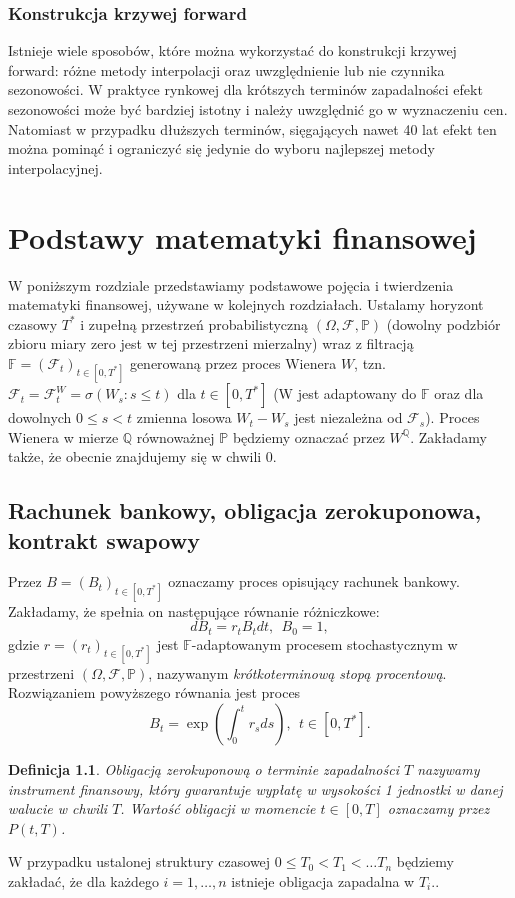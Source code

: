 \documentclass{mini}
\theoremstyle{mythstyle}
\newtheorem{Definicja}{Definicja}[chapter]
\begin{document}
	\subsection{Konstrukcja krzywej forward}
	
	Istnieje wiele sposobów, które można wykorzystać do konstrukcji krzywej forward: różne metody interpolacji oraz uwzględnienie lub nie czynnika sezonowości. W praktyce rynkowej dla krótszych terminów zapadalności efekt sezonowości może być bardziej istotny i należy uwzględnić go w wyznaczeniu cen. Natomiast w przypadku dłuższych terminów, sięgających nawet 40 lat efekt ten można pominąć i ograniczyć się jedynie do wyboru najlepszej metody interpolacyjnej.

\chapter{Podstawy matematyki finansowej}

	W poniższym rozdziale przedstawiamy podstawowe pojęcia i twierdzenia matematyki finansowej, używane w kolejnych rozdziałach. Ustalamy horyzont czasowy $T^*$ i zupełną przestrzeń probabilistyczną $(\Omega, \mathcal{F}, \mathbb{P})$ (dowolny podzbiór zbioru miary zero jest w tej przestrzeni mierzalny) wraz z filtracją $\mathbb{F} = (\mathcal{F}_t)_{t\in [0,T^*]}$ generowaną przez proces Wienera $W$, tzn. $\mathcal{F}_t=\mathcal{F}_t^W=\sigma(W_s:s\leq t)$ dla $t \in [0,T^*]$ (W jest adaptowany do $\mathbb{F}$ oraz dla dowolnych $0 \leq s < t $ zmienna losowa $W_t-W_s$ jest niezależna od $\mathcal{F}_s$). Proces Wienera w mierze $\mathbb{Q}$ równoważnej $\mathbb{P}$ będziemy oznaczać przez $W^\mathbb{Q}$. Zakładamy także, że obecnie znajdujemy się w chwili 0.

\section{Rachunek bankowy, obligacja zerokuponowa, kontrakt swapowy}
	Przez $B=(B_t)_{t\in [0,T^*]}$ oznaczamy proces opisujący rachunek bankowy. Zakładamy, że spełnia on następujące równanie różniczkowe:
	\[ dB_t = r_t B_t dt, \ \ B_0=1, \]
	gdzie $r=(r_t)_{t\in [0,T^*]}$ jest $\mathbb{F}$-adaptowanym procesem stochastycznym w przestrzeni $(\Omega, \mathcal{F},\mathbb{P})$, nazywanym \textit{krótkoterminową stopą procentową}.
	Rozwiązaniem powyższego równania jest proces
	\[ B_t = \exp\left(\int_0^t r_s ds\right), \ \ t\in [0,T^*]. \]

\begin{Definicja}
	Obligacją zerokuponową o terminie zapadalności $T$ nazywamy instrument finansowy, który gwarantuje wypłatę w wysokości 1 jednostki w danej walucie w chwili $T$. Wartość obligacji w momencie $t\in [0,T]$ oznaczamy przez $P(t,T)$.
\end{Definicja}
	W przypadku ustalonej struktury czasowej $0 \leq T_0 < T_1 <\ldots T_n$ będziemy zakładać, że dla każdego $i=1,\ldots,n$ istnieje obligacja zapadalna w $T_i$..
\end{document}
